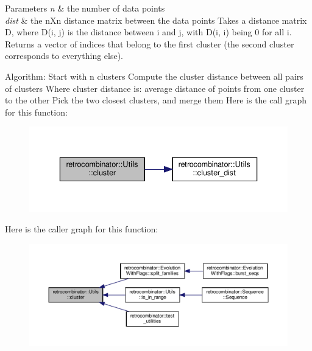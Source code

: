 \begin{DoxyParams}{Parameters}
{\em n} & the number of data points \\
\hline
{\em dist} & the n\+Xn distance matrix between the data points Takes a distance matrix D, where D(i, j) is the distance between i and j, with D(i, i) being 0 for all i. Returns a vector of indices that belong to the first cluster (the second cluster corresponds to everything else).\\
\hline
\end{DoxyParams}
Algorithm\+: Start with n clusters Compute the cluster distance between all pairs of clusters Where cluster distance is\+: average distance of points from one cluster to the other Pick the two closest clusters, and merge them Here is the call graph for this function\+:\nopagebreak
\begin{figure}[H]
\begin{center}
\leavevmode
\includegraphics[width=336pt]{namespaceretrocombinator_1_1Utils_a03dcc302a7444a0c0897ea1b306e69ef_cgraph}
\end{center}
\end{figure}
Here is the caller graph for this function\+:
\nopagebreak
\begin{figure}[H]
\begin{center}
\leavevmode
\includegraphics[width=350pt]{namespaceretrocombinator_1_1Utils_a03dcc302a7444a0c0897ea1b306e69ef_icgraph}
\end{center}
\end{figure}
\mbox{\label{namespaceretrocombinator_1_1Utils_a75c34419887242476ac8219dfb981459}} 
